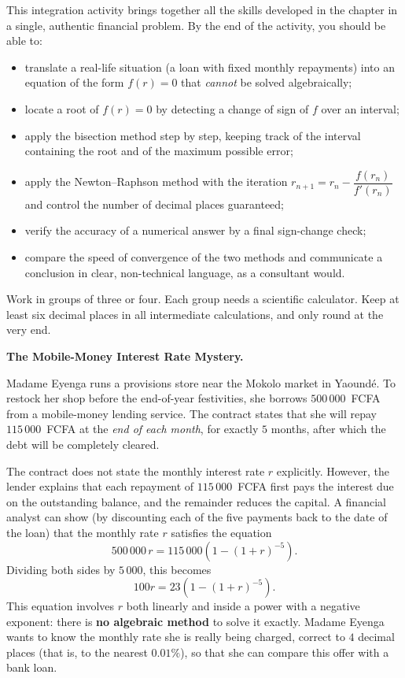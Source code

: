 \documentclass[11pt]{article}
\newcommand{\cle}[1]{{\popxbold\color{popdark}#1}}
\newcounter{popsec}
\newcounter{popsub}
\newcommand{\courssub}[1]{%
  \stepcounter{popsub}%
  \par\vspace{9pt}\noindent{\popxbold\fontsize{11.5}{13}\selectfont\color{popink}{\color{poporange}\thepopsec.\thepopsub}\hspace{6pt}#1}\par\nopagebreak\vspace{4pt}
}
\begin{document}
\courssub{Aims of the Activity}
This integration activity brings together all the skills developed in the chapter in a single, authentic financial problem. By the end of the activity, you should be able to:
\begin{itemize}
\item translate a real-life situation (a loan with fixed monthly repayments) into an equation of the form $f(r)=0$ that \emph{cannot} be solved algebraically;
\item locate a root of $f(r)=0$ by detecting a \cle{change of sign} of $f$ over an interval;
\item apply the \cle{bisection method} step by step, keeping track of the interval containing the root and of the maximum possible error;
\item apply the \cle{Newton--Raphson method} with the iteration $r_{n+1}=r_n-\dfrac{f(r_n)}{f'(r_n)}$ and control the number of decimal places guaranteed;
\item verify the accuracy of a numerical answer by a final sign-change check;
\item compare the speed of convergence of the two methods and communicate a conclusion in clear, non-technical language, as a consultant would.
\end{itemize}
Work in groups of three or four. Each group needs a scientific calculator. Keep at least six decimal places in all intermediate calculations, and only round at the very end.

\courssub{Situation}
\textbf{The Mobile-Money Interest Rate Mystery.}\par
Madame Eyenga runs a provisions store near the Mokolo market in Yaoundé. To restock her shop before the end-of-year festivities, she borrows $500\,000$~FCFA from a mobile-money lending service. The contract states that she will repay $115\,000$~FCFA at the \emph{end of each month}, for exactly $5$ months, after which the debt will be completely cleared.

The contract does not state the monthly interest rate $r$ explicitly. However, the lender explains that each repayment of $115\,000$~FCFA first pays the interest due on the outstanding balance, and the remainder reduces the capital. A financial analyst can show (by discounting each of the five payments back to the date of the loan) that the monthly rate $r$ satisfies the equation
\[ 500\,000\,r = 115\,000\left(1-(1+r)^{-5}\right). \]
Dividing both sides by $5\,000$, this becomes
\[ 100r = 23\left(1-(1+r)^{-5}\right). \]
This equation involves $r$ both linearly and inside a power with a negative exponent: there is \textbf{no algebraic method} to solve it exactly. Madame Eyenga wants to know the monthly rate she is really being charged, correct to $4$ decimal places (that is, to the nearest $0.01\%$), so that she can compare this offer with a bank loan.
\end{document}
